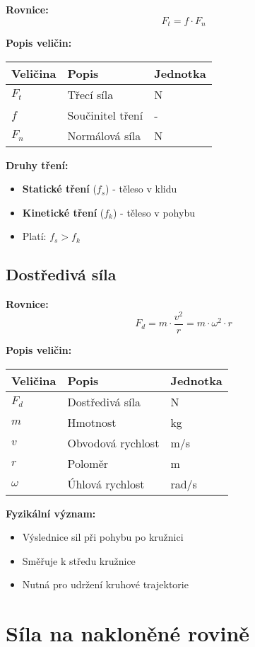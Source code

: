 \documentclass[11pt,a4paper]{article}
\begin{document}
\textbf{Rovnice:}
\[F_t = f \cdot F_n\]

\textbf{Popis veličin:}

\begin{longtable}{lll}
\toprule
Veličina & Popis & Jednotka \\
\midrule
$F_t$ & Třecí síla & N \\
$f$ & Součinitel tření & - \\
$F_n$ & Normálová síla & N \\
\bottomrule
\end{longtable}

\textbf{Druhy tření:}
\begin{itemize}
\item \textbf{Statické tření} ($f_s$) - těleso v klidu
\item \textbf{Kinetické tření} ($f_k$) - těleso v pohybu
\item Platí: $f_s > f_k$
\end{itemize}

\subsection{Dostředivá síla}

\textbf{Rovnice:}
\[F_d = m \cdot \frac{v^2}{r} = m \cdot \omega^2 \cdot r\]

\textbf{Popis veličin:}

\begin{longtable}{lll}
\toprule
Veličina & Popis & Jednotka \\
\midrule
$F_d$ & Dostředivá síla & N \\
$m$ & Hmotnost & kg \\
$v$ & Obvodová rychlost & m/s \\
$r$ & Poloměr & m \\
$\omega$ & Úhlová rychlost & rad/s \\
\bottomrule
\end{longtable}

\textbf{Fyzikální význam:}
\begin{itemize}
\item Výslednice sil při pohybu po kružnici
\item Směřuje k středu kružnice
\item Nutná pro udržení kruhové trajektorie
\end{itemize}

\clearpage

\section{Síla na nakloněné rovině}
\end{document}
